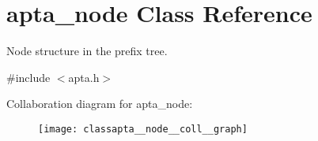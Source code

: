 \hypertarget{classapta__node}{}\section{apta\+\_\+node Class Reference}
\label{classapta__node}


Node structure in the prefix tree.  




{\ttfamily \#include $<$apta.\+h$>$}



Collaboration diagram for apta\+\_\+node\+:
\nopagebreak
\begin{figure}[H]
\begin{center}
\leavevmode
\texttt{[image: classapta\_\_node\_\_coll\_\_graph]}
\end{center}
\end{figure}
